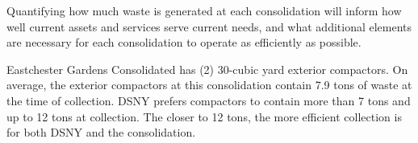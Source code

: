 
    Quantifying how much waste is generated at each consolidation will inform how well current assets and services serve current needs, and what additional elements are necessary for each consolidation to operate as efficiently as possible.
    
    Eastchester Gardens Consolidated has (2) 30-cubic yard exterior compactors. On average, the exterior compactors at this consolidation contain 7.9 tons of waste at the time of collection. DSNY prefers compactors to contain more than 7 tons and up to 12 tons at collection. The closer to 12 tons, the more efficient collection is for both DSNY and the consolidation.